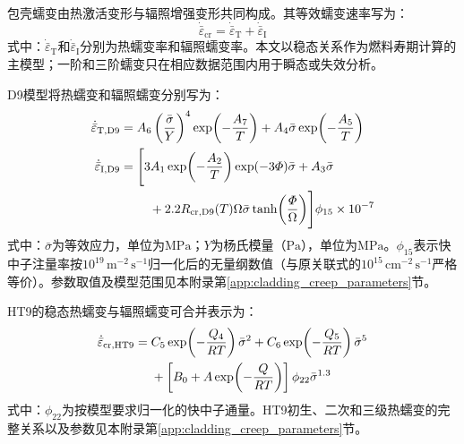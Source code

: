 包壳蠕变由热激活变形与辐照增强变形共同构成。其等效蠕变速率写为：
\begin{equation}
	\dot{\bar\varepsilon}_{\mathrm{cr}}
	=\dot{\bar\varepsilon}_{\mathrm T}
	+\dot{\bar\varepsilon}_{\mathrm I}
	\label{eq:clad_total_creep_rate}
\end{equation}
\noindent 式中：$\dot{\bar\varepsilon}_{\mathrm T}$和$\dot{\bar\varepsilon}_{\mathrm I}$分别为热蠕变率和辐照蠕变率。本文以稳态关系作为燃料寿期计算的主模型；一阶和三阶蠕变只在相应数据范围内用于瞬态或失效分析。

D9模型将热蠕变和辐照蠕变分别写为\cite{hofmanMetallicFuelsHandbook2019,halesBISONTheoryManual2016}：
\begin{subequations}\label{eq:d9_creep_rate}
	\begin{align}
		\dot{\bar\varepsilon}_{\mathrm T,\mathrm{D9}}
		={}&A_6\left(\frac{\bar\sigma}{Y}\right)^4
		\exp\!\left(-\frac{A_7}{T}\right)
		+A_4\bar\sigma\exp\!\left(-\frac{A_5}{T}\right)
		\label{eq:d9_thermal_creep_rate}\\
		\dot{\bar\varepsilon}_{\mathrm I,\mathrm{D9}}
		={}&\Biggl[
		3A_1\exp\!\left(-\frac{A_2}{T}\right)
		\exp(-3\varPhi)\bar\sigma
		+A_3\bar\sigma
		\notag\\
		&\quad
		+2.2R_{\mathrm{cr,D9}}(T)\Omega\bar\sigma
		\tanh\!\left(\frac{\varPhi}{\Omega}\right)
		\Biggr]\phi_{15}\times10^{-7}
		\label{eq:d9_irradiation_creep_rate}
	\end{align}
\end{subequations}
\noindent 式中：$\bar\sigma$为等效应力，单位为$\mathrm{MPa}$；$Y$为杨氏模量（$\mathrm{Pa}$），单位为$\mathrm{MPa}$。$\phi_{15}$表示快中子注量率按$10^{19}\,\mathrm{m^{-2}\,s^{-1}}$归一化后的无量纲数值（与原关联式的$10^{15}\,\mathrm{cm^{-2}\,s^{-1}}$严格等价）。参数取值及模型范围见本附录第\ref{app:cladding_creep_parameters}节。

HT9的稳态热蠕变与辐照蠕变可合并表示为\cite{hofmanMetallicFuelsHandbook2019,halesBISONTheoryManual2016}：
\begin{align}
	\dot{\bar\varepsilon}_{\mathrm{cr,HT9}}
	={}&C_5\exp\!\left(-\frac{Q_4}{RT}\right)\bar\sigma^2
	+C_6\exp\!\left(-\frac{Q_5}{RT}\right)\bar\sigma^5
	\notag\\
	&+\left[
	B_0+A\exp\!\left(-\frac{Q}{RT}\right)
	\right]\phi_{22}\bar\sigma^{1.3}
	\label{eq:ht9_steady_creep_rate}
\end{align}
\noindent 式中：$\phi_{22}$为按模型要求归一化的快中子通量。HT9初生、二次和三级热蠕变的完整关系以及参数见本附录第\ref{app:cladding_creep_parameters}节。

